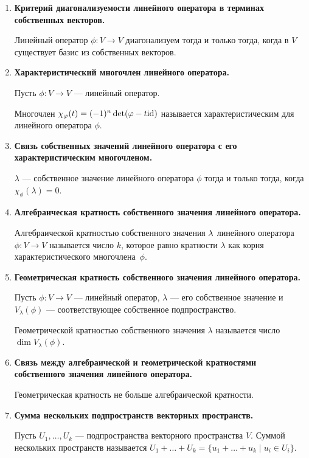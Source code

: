 \begin{enumerate}
\item \textbf{Критерий диагонализуемости линейного оператора в терминах собственных векторов.}

Линейный оператор $\phi\colon V \rightarrow V$ диагонализуем тогда и только тогда, когда в $V$ существует базис из собственных векторов.

\item \textbf{Характеристический многочлен линейного оператора.}

Пусть $\phi\colon V \rightarrow V$ --- линейный оператор.

Многочлен $\chi_{\varphi}(t) = (-1)^n\det(\varphi - t \mathrm{id})$ называется характеристическим для линейного оператора $\phi$.

\item \textbf{Связь собственных значений линейного оператора с его характеристическим многочленом.}

$\lambda$ --- собственное значение линейного оператора $\phi$ тогда и только тогда, когда $\chi_\phi(\lambda) = 0$. 

\item \textbf{Алгебраическая кратность собственного значения линейного оператора.}

Алгебраической кратностью собственного значения $\lambda$ линейного оператора $\phi \colon V \to V$ называется число $k$, которое равно кратности $\lambda$ как корня характеристического многочлена~$\phi$.

\item \textbf{Геометрическая кратность собственного значения линейного оператора.}

Пусть $\phi\colon V \rightarrow V$ --- линейный оператор, $\lambda$ --- его собственное значение и $V_\lambda(\phi)$ --- соответствующее собственное подпространство.

Геометрической кратностью собственного значения $\lambda$ называется число $\dim V_\lambda(\phi)$.

\item \textbf{Связь между алгебраической и геометрической кратностями собственного значения линейного оператора.}

Геометрическая кратность не больше алгебраической кратности.

\item \textbf{Сумма нескольких подпространств векторных пространств.}

Пусть $U_1, \ldots, U_k$ --- подпространства векторного пространства $V$. Суммой нескольких пространств называется $U_1 + \ldots + U_k = \{u_1 + \ldots + u_k \; | \; u_i \in U_i \}$.


\end{enumerate}
